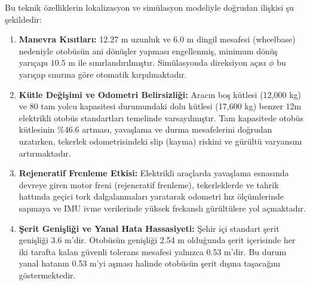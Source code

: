 ﻿\documentclass[conference]{IEEEtran}
\begin{document}
Bu teknik özelliklerin lokalizasyon ve simülasyon modeliyle doğrudan ilişkisi şu şekildedir:
\begin{enumerate}
    \item \textbf{Manevra Kısıtları:} 12.27 m uzunluk ve 6.0 m dingil mesafesi (wheelbase) nedeniyle otobüsün ani dönüşler yapması engellenmiş, minimum dönüş yarıçapı $10.5$ m ile sınırlandırılmıştır. Simülasyonda direksiyon açısı $\phi$ bu yarıçap sınırına göre otomatik kırpılmaktadır.
    \item \textbf{Kütle Değişimi ve Odometri Belirsizliği:} Aracın boş kütlesi (12,000 kg) ve 80 tam yolcu kapasitesi durumundaki dolu kütlesi (17,600 kg) benzer 12m elektrikli otobüs standartları temelinde varsayılmıştır. Tam kapasitede otobüs kütlesinin \%46.6 artması, yavaşlama ve durma mesafelerini doğrudan uzatırken, tekerlek odometrisindeki slip (kayma) riskini ve gürültü varyansını artırmaktadır.
    \item \textbf{Rejeneratif Frenleme Etkisi:} Elektrikli araçlarda yavaşlama esnasında devreye giren motor freni (rejeneratif frenleme), tekerleklerde ve tahrik hattında geçici tork dalgalanmaları yaratarak odometri hız ölçümlerinde sapmaya ve IMU ivme verilerinde yüksek frekanslı gürültülere yol açmaktadır.
    \item \textbf{Şerit Genişliği ve Yanal Hata Hassasiyeti:} Şehir içi standart şerit genişliği 3.6 m'dir. Otobüsün genişliği 2.54 m olduğunda şerit içerisinde her iki tarafta kalan güvenli tolerans mesafesi yalnızca 0.53 m'dir. Bu durum yanal hatanın 0.53 m'yi aşması halinde otobüsün şerit dışına taşacağını göstermektedir.
\end{enumerate}
\end{document}
